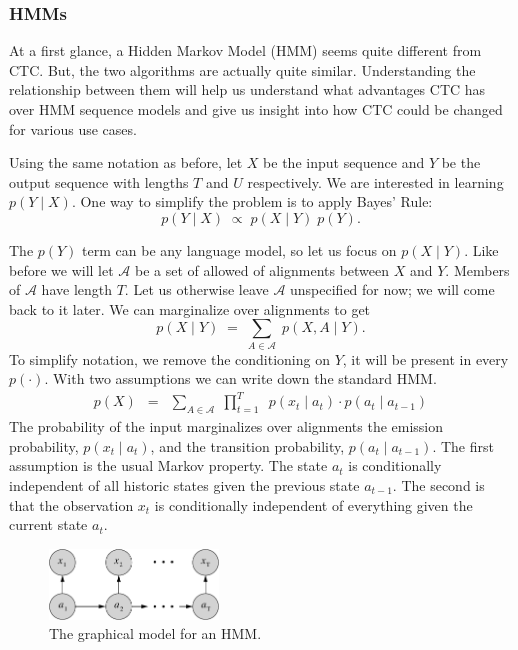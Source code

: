 \subsubsection{HMMs}

At a first glance, a Hidden Markov Model (HMM) seems quite different from
CTC. But, the two algorithms are actually quite similar. Understanding the
relationship between them will help us understand what advantages CTC has over
HMM sequence models and give us insight into how CTC could be changed for
various use cases.

Using the same notation as before, let $X$ be the input sequence and $Y$ be the
output sequence with lengths $T$ and $U$ respectively. We are interested in
learning $p(Y \mid X)$. One way to simplify the problem is to apply Bayes'
Rule:
\[
p(Y \mid X) \; \propto \; p(X \mid Y) \; p(Y).
\]

The $p(Y)$ term can be any language model, so let us focus on $p(X \mid Y)$.
Like before we will let $\mathcal{A}$ be a set of allowed of alignments between
$X$ and $Y$. Members of $\mathcal{A}$ have length $T$. Let us otherwise leave
$\mathcal{A}$ unspecified for now; we will come back to it later. We can
marginalize over alignments to get
\[
p(X \mid Y)\; = \; \sum_{A \in \mathcal{A}} \; p(X, A \mid Y).
\]
To simplify notation, we remove the conditioning on $Y$, it will be present in
every $p(\cdot)$. With two assumptions we can write down the standard HMM.
\begin{align*}
p(X) \enspace = \enspace \sum_{A \in \mathcal{A}} \; \prod_{t=1}^T \enspace
                p(x_t \mid a_t) \cdot p(a_t \mid a_{t-1})
\end{align*}
The probability of the input marginalizes over alignments the emission
probability, $p(x_t \mid a_t)$, and the transition probability, $p(a_t \mid
a_{t-1})$. The first assumption is the usual Markov property. The state $a_t$
is conditionally independent of all historic states given the previous state
$a_{t-1}$. The second is that the observation $x_t$ is conditionally
independent of everything given the current state $a_t$.

\begin{figure}
\centering
\includegraphics[width=0.4\textwidth]{background/figures/hmm.pdf}
\caption{The graphical model for an HMM.}
\end{figure}

